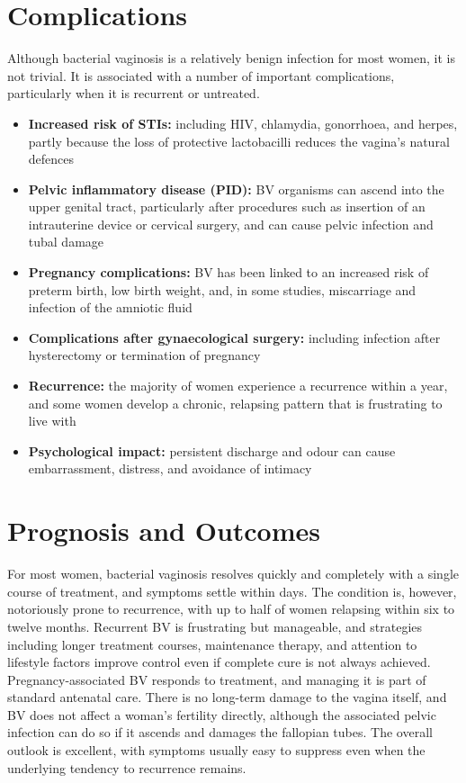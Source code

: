 \section*{Complications}
Although bacterial vaginosis is a relatively benign infection for most women, it is not trivial. It is associated with a number of important complications, particularly when it is recurrent or untreated.

\begin{itemize}
    \item \textbf{Increased risk of STIs:} including HIV, chlamydia, gonorrhoea, and herpes, partly because the loss of protective lactobacilli reduces the vagina's natural defences
    \item \textbf{Pelvic inflammatory disease (PID):} BV organisms can ascend into the upper genital tract, particularly after procedures such as insertion of an intrauterine device or cervical surgery, and can cause pelvic infection and tubal damage
    \item \textbf{Pregnancy complications:} BV has been linked to an increased risk of preterm birth, low birth weight, and, in some studies, miscarriage and infection of the amniotic fluid
    \item \textbf{Complications after gynaecological surgery:} including infection after hysterectomy or termination of pregnancy
    \item \textbf{Recurrence:} the majority of women experience a recurrence within a year, and some women develop a chronic, relapsing pattern that is frustrating to live with
    \item \textbf{Psychological impact:} persistent discharge and odour can cause embarrassment, distress, and avoidance of intimacy
\end{itemize}

\section*{Prognosis and Outcomes}
For most women, bacterial vaginosis resolves quickly and completely with a single course of treatment, and symptoms settle within days. The condition is, however, notoriously prone to recurrence, with up to half of women relapsing within six to twelve months. Recurrent BV is frustrating but manageable, and strategies including longer treatment courses, maintenance therapy, and attention to lifestyle factors improve control even if complete cure is not always achieved. Pregnancy-associated BV responds to treatment, and managing it is part of standard antenatal care. There is no long-term damage to the vagina itself, and BV does not affect a woman's fertility directly, although the associated pelvic infection can do so if it ascends and damages the fallopian tubes. The overall outlook is excellent, with symptoms usually easy to suppress even when the underlying tendency to recurrence remains.

